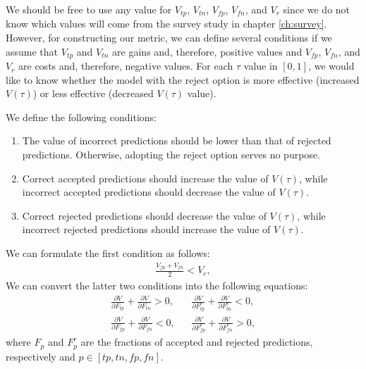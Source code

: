 %
We should be free to use any value for $V_{tp}$, $V_{tn}$, $V_{fp}$, $V_{fn}$, and $V_r$ since we do not know which values will come from the survey study in chapter \ref{ch:survey}.
%
However, for constructing our metric, we can define several conditions if we assume that $V_{tp}$ and $V_{tn}$ are gains and, therefore, positive values and $V_{fp}$, $V_{fn}$, and $V_{r}$ are costs and, therefore, negative values.
%
For each $\tau$ value in $[0, 1]$, we would like to know whether the model with the reject option is more effective (increased $V(\tau)$) or less effective (decreased $V(\tau)$ value).
%

\pagebreak

%
\begin{flushleft}
    We define the following conditions:
\end{flushleft}
\begin{enumerate}
    \item The value of incorrect predictions should be lower than that of rejected predictions. Otherwise, adopting the reject option serves no purpose.
    \item Correct accepted predictions should increase the value of $V(\tau)$, while incorrect accepted predictions should decrease the value of $V(\tau)$.
    \item Correct rejected predictions should decrease the value of $V(\tau)$, while incorrect rejected predictions should increase the value of $V(\tau)$.
\end{enumerate}
%
We can formulate the first condition as follows:
% 
\begin{align}
    \label{for:value-condition}
    \frac{V_{fp} + V_{fn}}{2} < V_r,
\end{align}
%
We can convert the latter two conditions into the following equations:
\begin{subequations}
    \label{for:conditions}
    \begin{align}
        \frac{\partial V}{\partial F_{tp}} + \frac{\partial V}{\partial F_{tn}} > 0, &  &
        \frac{\partial V}{\partial F^r_{tp}} + \frac{\partial V}{\partial F^r_{tn}} < 0, \label{for:conditions-tp-tn} \\
        \frac{\partial V}{\partial F_{fp}} + \frac{\partial V}{\partial F_{fn}} < 0, &  &
        \frac{\partial V}{\partial F^r_{fp}} + \frac{\partial V}{\partial F^r_{fn}} > 0, \label{for:conditions-fp-fn}
    \end{align}
\end{subequations}
%
where $F_p$ and $F_p^r$ are the fractions of accepted and rejected predictions, respectively and $p \in [tp, tn, fp, fn]$.
